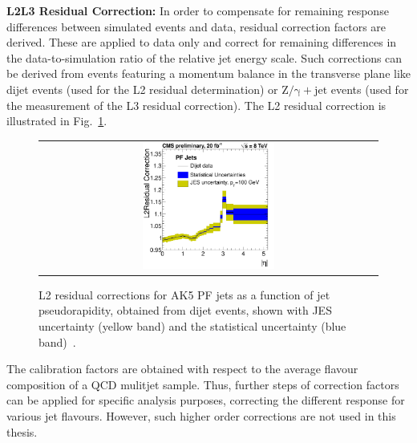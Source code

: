 \begin{description}
 \item \textbf{L2L3 Residual Correction:} In order to compensate for remaining response differences between simulated events and data, residual correction factors are derived. These are applied to data only and correct for remaining differences in the data-to-simulation ratio of the relative jet energy scale. Such corrections can be derived from events featuring a momentum balance in the transverse plane like dijet events (used for the L2 residual determination) or $\mathrm{Z/\gamma+jet}$ events (used for the measurement of the L3 residual correction). The L2 residual correction is illustrated in Fig.~\ref{fig:l2res}.
\begin{figure}[!h]
  \centering 
  \begin{tabular}{c}
    \includegraphics[width=0.4\textwidth]{figures/ResComp_FSRcorr_residuals_Abseta_PF_DiJetData.pdf} 
  \end{tabular}
  \caption{L2 residual corrections for AK5 PF jets as a function of jet pseudorapidity, obtained from dijet events, shown with JES uncertainty (yellow band) and the statistical uncertainty (blue band)~\cite{CMS-DP-2013-033}.}
  \label{fig:l2res}
\end{figure}

\end{description}
The calibration factors are obtained with respect to the average flavour composition of a QCD mulitjet sample. Thus, further steps of correction factors can be applied for specific analysis purposes, \eg correcting the different response for various jet flavours. However, such higher order corrections are not used in this thesis.  

